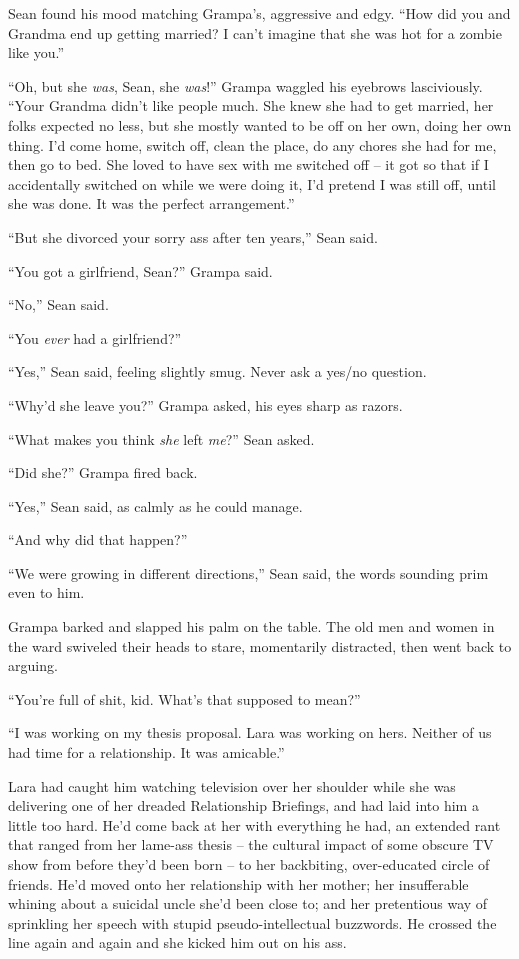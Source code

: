 Sean found his mood matching Grampa's, aggressive and edgy. “How did 
you and Grandma end up getting married? I can't imagine that she was 
hot for a zombie like you.”

“Oh, but she \emph{was}, Sean, she \emph{was}!” Grampa waggled his 
eyebrows lasciviously. “Your Grandma didn't like people much. She 
knew she had to get married, her folks expected no less, but she mostly 
wanted to be off on her own, doing her own thing. I'd come home, switch 
off, clean the place, do any chores she had for me, then go to bed. She 
loved to have sex with me switched off -- it got so that if I 
accidentally switched on while we were doing it, I'd pretend I was 
still off, until she was done. It was the perfect arrangement.”

“But she divorced your sorry ass after ten years,” Sean said.

“You got a girlfriend, Sean?” Grampa said.

“No,” Sean said.

“You \emph{ever} had a girlfriend?”

“Yes,” Sean said, feeling slightly smug. Never ask a yes/no question.

“Why'd she leave you?” Grampa asked, his eyes sharp as razors.

“What makes you think \emph{she} left \emph{me}?” Sean asked.

“Did she?” Grampa fired back.

“Yes,” Sean said, as calmly as he could manage.

“And why did that happen?”

“We were growing in different directions,” Sean said, the words 
sounding prim even to him.

Grampa barked and slapped his palm on the table. The old men and women 
in the ward swiveled their heads to stare, momentarily distracted, then 
went back to arguing.

“You're full of shit, kid. What's that supposed to mean?”

“I was working on my thesis proposal. Lara was working on hers. 
Neither of us had time for a relationship. It was amicable.”

Lara had caught him watching television over her shoulder while she was 
delivering one of her dreaded Relationship Briefings, and had laid into 
him a little too hard. He'd come back at her with everything he had, an 
extended rant that ranged from her lame-ass thesis -- the cultural 
impact of some obscure TV show from before they'd been born -- to her 
backbiting, over-educated circle of friends. He'd moved onto her 
relationship with her mother; her insufferable whining about a suicidal 
uncle she'd been close to; and her pretentious way of sprinkling her 
speech with stupid pseudo-intellectual buzzwords. He crossed the line 
again and again and she kicked him out on his ass.

